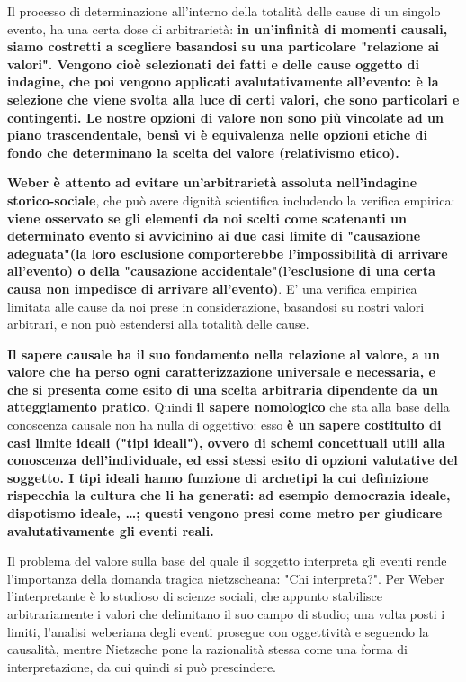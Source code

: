 Il processo di determinazione all'interno della totalità delle cause di un singolo evento, ha una certa dose di arbitrarietà: \textbf{in un'infinità di momenti causali, siamo costretti a scegliere basandosi su una particolare "relazione ai valori". Vengono cioè selezionati dei fatti e delle cause oggetto di indagine, che poi vengono applicati avalutativamente all'evento: è la selezione che viene svolta alla luce di certi valori, che sono particolari e contingenti. Le nostre opzioni di valore non sono più vincolate  ad un piano trascendentale, bensì vi è equivalenza nelle opzioni etiche di fondo che determinano la scelta del valore (relativismo etico).}

\textbf{Weber è attento ad evitare un'arbitrarietà assoluta nell'indagine storico-sociale}, che può avere dignità scientifica includendo la verifica empirica: \textbf{viene osservato se gli elementi da noi scelti come scatenanti un determinato evento si avvicinino ai due casi limite di "causazione adeguata"(la loro esclusione comporterebbe l'impossibilità di arrivare all'evento) o della "causazione accidentale"(l'esclusione di una certa causa non impedisce di arrivare all'evento)}. E' una verifica empirica limitata  alle cause da noi prese in considerazione, basandosi su nostri valori arbitrari, e non può estendersi alla totalità delle cause.

\textbf{Il sapere causale ha il suo fondamento nella relazione al valore, a un valore che ha perso ogni caratterizzazione universale e necessaria, e che si presenta come esito di una scelta arbitraria dipendente  da  un atteggiamento pratico.}
Quindi \textbf{il sapere nomologico} che sta alla base della conoscenza causale non ha nulla di oggettivo: esso \textbf{è un sapere costituito  di casi limite ideali ("tipi ideali"), ovvero di schemi concettuali utili alla conoscenza dell'individuale, ed essi stessi esito di  opzioni valutative del soggetto. I tipi ideali hanno funzione di archetipi la cui definizione rispecchia la cultura che li ha generati: ad esempio democrazia ideale, dispotismo ideale, \dots; questi vengono presi come metro per giudicare avalutativamente gli eventi reali.}
 
Il problema del valore sulla base del quale il soggetto interpreta gli eventi rende l'importanza della domanda tragica nietzscheana: "Chi interpreta?". Per Weber l'interpretante è lo studioso di scienze sociali, che appunto stabilisce arbitrariamente i valori che delimitano il suo campo di studio; una volta posti i limiti, l'analisi weberiana degli eventi prosegue con oggettività e seguendo la causalità, mentre Nietzsche pone la razionalità stessa come una forma di interpretazione, da cui quindi si può prescindere.

